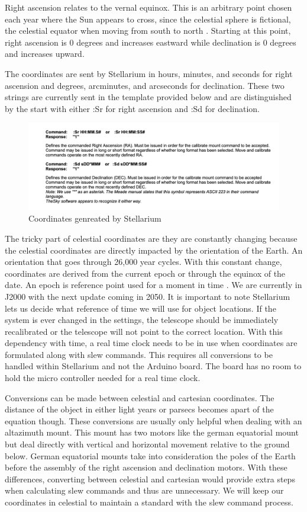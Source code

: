 \documentclass[12pt]{report}
\begin{document}
Right ascension relates to the vernal equinox. This is an arbitrary point chosen each year where the Sun appears to cross, since the celestial sphere is fictional, the celestial equator when moving from south to north \cite{celestial}. Starting at this point, right ascension is 0 degrees and increases eastward while declination is 0 degrees and increases upward.

The coordinates are sent by Stellarium in hours, minutes, and seconds for right ascension and degrees, arcminutes, and arcseconds for declination. These two strings are currently sent in the template provided below and are distinguished by the start with either :Sr for right ascension and :Sd for declination.

\begin{figure}[h]
  \centering
  \includegraphics[width=\linewidth]{convStell}
  \caption{Coordinates genreated by Stellarium}
\end{figure}

The tricky part of celestial coordinates are they are constantly changing because the celestial coordinates are directly impacted by the orientation of the Earth. An orientation that goes through 26,000 year cycles. With this constant change, coordinates are derived from the current epoch or through the equinox of the date. An epoch is reference point used for a moment in time \cite{epoch}. We are currently in J2000 with the next update coming in 2050. It is important to note Stellarium lets us decide what reference of time we will use for object locations. If the system is ever changed in the settings, the telescope should be immediately recalibrated or the telescope will not point to the correct location. With this dependency with time, a real time clock needs to be in use when coordinates are formulated along with slew commands. This requires all conversions to be handled within Stellarium and not the Arduino board. The board has no room to hold the micro controller needed for a real time clock.

Conversions can be made between celestial and cartesian coordinates. The distance of the object in either light years or parsecs becomes apart of the equation though. These conversions are usually only helpful when dealing with an altazimuth mount. This mount has two motors like the german equatorial mount but deal directly with vertical and horizontal movement relative to the ground below. German equatorial mounts take into consideration the poles of the Earth before the assembly of the right ascension and declination motors. With these differences, converting between celestial and cartesian would provide extra steps when calculating slew commands and thus are unnecessary. We will keep our coordinates in celestial to maintain a standard with the slew command process.
\end{document}
